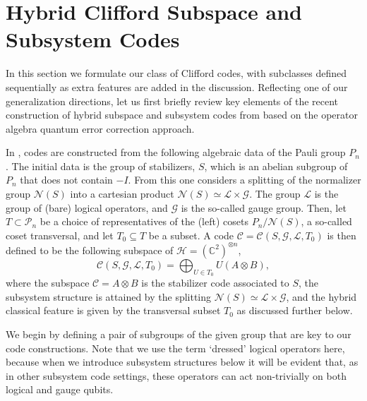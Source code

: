 \documentclass[11pt]{article}
\theoremstyle{definition}
\newcommand{\bbC}{\mathbb{C}}
\newcommand{\calC}{\mathcal{C}}
\newcommand{\calG}{\mathcal{G}}
\newcommand{\calH}{\mathcal{H}}
\newcommand{\calL}{\mathcal{L}}
\newcommand{\calN}{\mathcal{N}}
\newcommand{\calP}{\mathcal{P}}
\begin{document}
\section{Hybrid Clifford Subspace and Subsystem Codes}

In this section we formulate our class of Clifford codes, with subclasses defined sequentially as extra features are added in the discussion. 
Reflecting one of our generalization directions, let us first briefly review key elements of the recent construction of hybrid subspace and subsystem codes from \cite{DauphinaiKribsVasmer2024} based on the operator algebra quantum error correction approach. 

In \cite{DauphinaiKribsVasmer2024}, codes are constructed from the following algebraic data of the Pauli group $P_n$. The initial data is the group of stabilizers, $S$, which is an abelian subgroup of $P_n$ that does not contain $-I$. From this one considers a splitting of the normalizer group $\calN(S)$ into a cartesian product $\calN(S) \simeq \calL \times \calG$. The group $\calL$ is the group of (bare) logical operators, and $\calG$ is the so-called gauge group. Then, let $T \subset \calP_n$ be a choice of representatives of the (left) cosets $P_n/\calN(S)$, a so-called coset transversal, and let $T_0 \subseteq T$ be a subset. A code $\calC = \calC(S,\calG,\calL,T_0)$ is then defined to be the following subspace of $\calH = (\bbC^2)^{\otimes n}$,
\begin{equation*}
    \calC(S,\calG,\calL,T_0) = \bigoplus_{U \in T_0} U(A \otimes B),
\end{equation*}
where the subspace $\calC = A \otimes B$ is the stabilizer code associated to $S$, the subsystem structure is attained by the splitting $\calN(S) \simeq \calL \times \calG$, and the hybrid classical feature is given by the transversal subset $T_0$ as discussed further below.

We begin by defining a pair of subgroups of the given group that are key to our code constructions. Note that we use the term `dressed' logical operators here, because when we introduce subsystem structures below it will be evident that, as in other subsystem code settings, these operators can act non-trivially on both logical and gauge qubits. 
\end{document}
